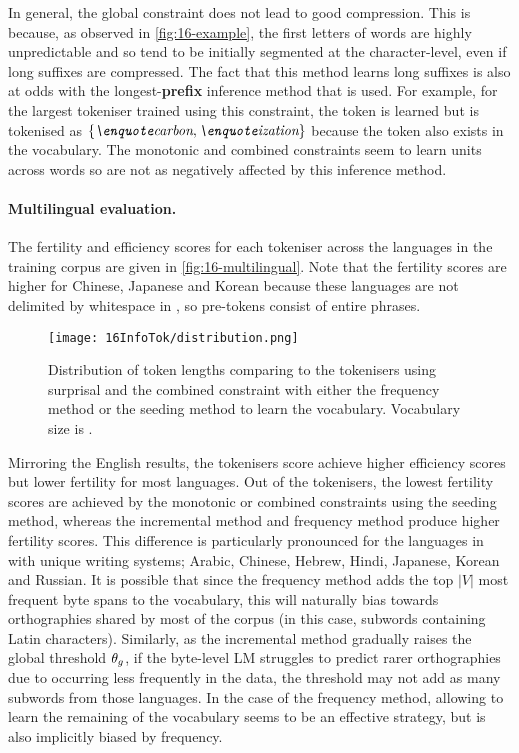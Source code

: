 In general, the global constraint does not lead to good compression. This is because, as observed in \cref{fig:16-example}, the first letters of words are highly unpredictable and so tend to be initially segmented at the character-level, even if long suffixes are compressed. The fact that this method learns long suffixes is also at odds with the longest-\textbf{prefix} inference method that is used. For example, for the largest tokeniser trained using this constraint, the token  is learned but  is tokenised as \(\{\ex{carbon},\ex{ization}\}\) because the token  also exists in the vocabulary. The monotonic and combined constraints seem to learn units across words so are not as negatively affected by this inference method.

\paragraph{Multilingual evaluation.}

The fertility and \renyi efficiency scores for each tokeniser across the  languages in the training corpus are given in \cref{fig:16-multilingual}. Note that the fertility scores are higher for Chinese, Japanese and Korean because these languages are not delimited by whitespace in \commoncorpus, so pre-tokens consist of entire phrases. 

\begin{figure}[!t]
    \centering
    \texttt{[image: 16InfoTok/distribution.png]}
    \caption{Distribution of token lengths comparing \bpewp to the \bytespan tokenisers using surprisal and the combined constraint with either the frequency method or the seeding method to learn the vocabulary. Vocabulary size is .}
    \label{fig:16-distribution}
\end{figure}

Mirroring the English results, the \bytespan tokenisers score achieve higher \renyi efficiency scores but lower fertility for most languages. Out of the \bytespan tokenisers, the lowest fertility scores are achieved by the monotonic or combined constraints using the seeding method, whereas the incremental method and frequency method produce higher fertility scores. This difference is particularly pronounced for the languages in \commoncorpus with unique writing systems; Arabic, Chinese, Hebrew, Hindi, Japanese, Korean and Russian. It is possible that since the frequency method adds the top $|V|$ most frequent byte spans to the vocabulary, this will naturally bias towards orthographies shared by most of the corpus (in this case, subwords containing Latin characters). Similarly, as the incremental method gradually raises the global threshold $\theta_g$, if the byte-level LM struggles to predict rarer orthographies due to occurring less frequently in the data, the threshold may not add as many subwords from those languages. In the case of the frequency method, allowing \bpe to learn the remaining  of the vocabulary seems to be an effective strategy, but \bpe is also implicitly biased by frequency.

